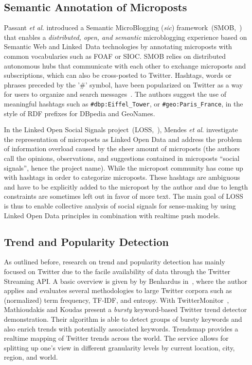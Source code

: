 \documentclass{iosart2c}
\begin{document}
\subsection{Semantic Annotation of Microposts}
Passant \textit{et al.} introduced a Semantic MicroBlogging (\textit{sic}) framework~(SMOB,~\cite{Passant2008}) that enables a \textit{distributed, open, and semantic} microblogging experience based on Semantic Web and Linked~Data technologies by annotating microposts with common vocabularies such as FOAF or SIOC.
SMOB relies on distributed autonomous hubs that communicate with each other to exchange microposts and subscriptions, which can also be cross-posted to Twitter.
Hashtags, words or phrases preceded by the '\#' symbol, have been popularized on Twitter as a way for users to organize and search messages~\cite{hashtag}.
The authors suggest the use of meaningful hashtags such as \texttt{\#dbp:Eiffel\_Tower}, or \texttt{\#geo:Paris\_France}, in the style of RDF prefixes for DBpedia and GeoNames.

In the Linked Open Social Signals project~(LOSS,~\cite{Mendes:LOSS}), Mendes \textit{et al.} investigate the representation of microposts as Linked Open Data and address the problem of information overload caused by the sheer amount of microposts (the authors call the opinions, observations, and suggestions contained in microposts ``social signals'', hence the project name).
While the micropost community has come up with hashtags in order to categorize microposts.
These hashtags are ambiguous and have to be explicitly added to the micropost by the author and due to length constraints are sometimes left out in favor of more text.
The main goal of LOSS is thus to enable collective analysis of social signals for sense-making by using Linked Open Data principles in combination with realtime push models.

\subsection{Trend and Popularity Detection}
As outlined before, research on trend and popularity detection has mainly focused on Twitter due to the facile availability of data through the Twitter Streaming API.
A basic overview is given by by Benhardus in~\cite{benhardus2010streaming}, where the author applies and evaluates several methodologies to large Twitter corpora such as (normalized) term frequency, TF-IDF, and entropy.
With TwitterMonitor~\cite{Mathioudakis:2010:TTD:1807167.1807306}, Mathioudakis and Koudas present a \textit{bursty} keyword-based Twitter trend detector demonstration.
Their algorithm is able to detect groups of bursty keywords and also enrich trends with potentially associated keywords.
Trendsmap provides a realtime mapping of Twitter trends across the world.
The service allows for splitting up one's view in different granularity levels by current location, city, region, and world.
\end{document}

